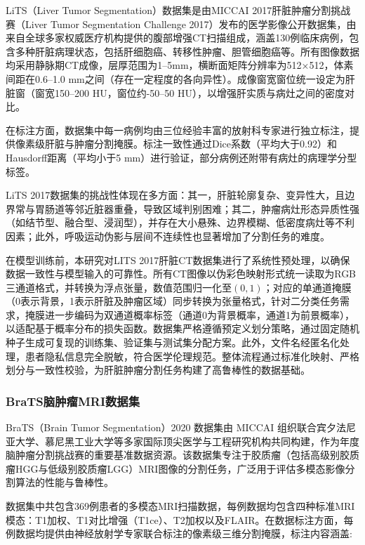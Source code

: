 LiTS（Liver Tumor Segmentation）数据集是由MICCAI 2017肝脏肿瘤分割挑战赛（Liver Tumor Segmentation Challenge 2017）发布的医学影像公开数据集，由来自全球多家权威医疗机构提供的腹部增强CT扫描组成，涵盖130例临床病例，包含多种肝脏病理状态，包括肝细胞癌、转移性肿瘤、胆管细胞癌等\cite{Bilic_2023}。所有图像数据均采用静脉期CT成像，层厚范围为1–5mm，横断面矩阵分辨率为512×512，体素间距在0.6–1.0 mm之间（存在一定程度的各向异性）。成像窗宽窗位统一设定为肝脏窗（窗宽150–200 HU，窗位约-50–50 HU），以增强肝实质与病灶之间的密度对比。

在标注方面，数据集中每一病例均由三位经验丰富的放射科专家进行独立标注，提供像素级肝脏与肿瘤分割掩膜。标注一致性通过Dice系数（平均大于0.92）和Hausdorff距离（平均小于5 mm）进行验证，部分病例还附带有病灶的病理学分型标签。

LiTS 2017数据集的挑战性体现在多方面：其一，肝脏轮廓复杂、变异性大，且边界常与胃肠道等邻近脏器重叠，导致区域判别困难；其二，肿瘤病灶形态异质性强（如结节型、融合型、浸润型），并存在大小悬殊、边界模糊、低密度病灶等不利因素；此外，呼吸运动伪影与层间不连续性也显著增加了分割任务的难度。

在模型训练前，本研究对LITS 2017肝脏CT数据集进行了系统性预处理，以确保数据一致性与模型输入的可靠性。所有CT图像以伪彩色映射形式统一读取为RGB三通道格式，并转换为浮点张量，数值范围归一化至$(0,1)$；对应的单通道掩膜（0表示背景，1表示肝脏及肿瘤区域）同步转换为张量格式，针对二分类任务需求，掩膜进一步编码为双通道概率标签（通道0为背景概率，通道1为前景概率），以适配基于概率分布的损失函数。数据集严格遵循预定义划分策略，通过固定随机种子生成可复现的训练集、验证集与测试集分配方案。此外，文件名经匿名化处理，患者隐私信息完全脱敏，符合医学伦理规范。整体流程通过标准化映射、严格划分与一致性校验，为肝脏肿瘤分割任务构建了高鲁棒性的数据基础。

\subsubsection{BraTS脑肿瘤MRI数据集}

BraTS（Brain Tumor Segmentation）2020 数据集由 MICCAI 组织联合宾夕法尼亚大学、慕尼黑工业大学等多家国际顶尖医学与工程研究机构共同构建，作为年度脑肿瘤分割挑战赛的重要基准数据资源\cite{menze2015}。该数据集专注于胶质瘤（包括高级别胶质瘤HGG与低级别胶质瘤LGG）MRI图像的分割任务，广泛用于评估多模态影像分割算法的性能与鲁棒性。

数据集中共包含369例患者的多模态MRI扫描数据，每例数据均包含四种标准MRI模态：T1加权、T1对比增强（T1ce）、T2加权以及FLAIR。在数据标注方面，每例数据均提供由神经放射学专家联合标注的像素级三维分割掩膜，标注内容涵盖:

